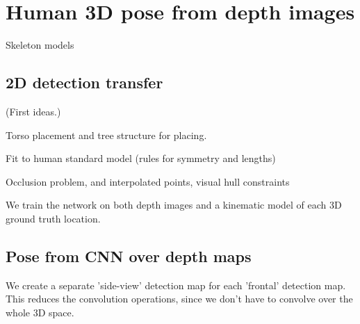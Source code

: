 \chapter{Human 3D pose from depth images}

Skeleton models


\section{2D detection transfer}

(First ideas.)

Torso placement and tree structure for placing.

Fit to human standard model (rules for symmetry and lengths)

Occlusion problem, and interpolated points, visual hull constraints

We train the network on both depth images and a kinematic model of each 3D ground truth location.

\section{Pose from CNN over depth maps}

We create a separate 'side-view' detection map for each 'frontal' detection map. This reduces the convolution operations, since we don't have to convolve over the whole 3D space.
